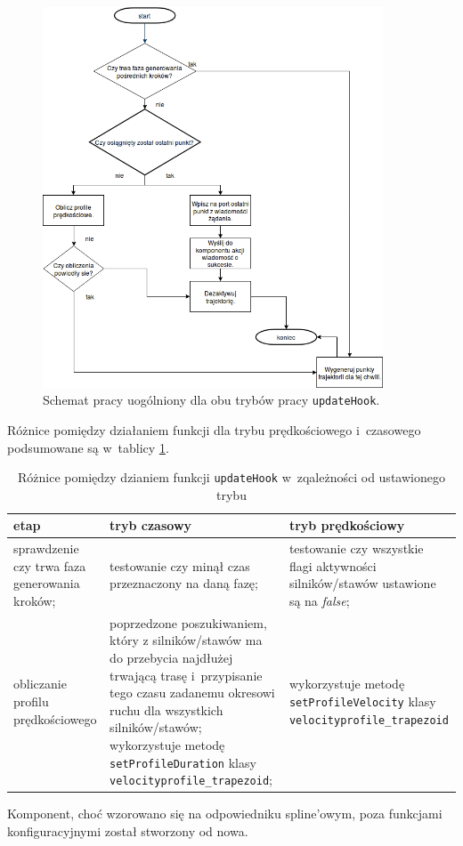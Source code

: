 \documentclass[a4paper, 12pt]{article}
\begin{document}
	\begin{figure}[H]
	\centering
	\includegraphics[width=0.9\textwidth]{raport_pics/updateHookDiagram.png}
	\caption{Schemat pracy uogólniony dla obu trybów pracy \texttt{updateHook}.}
	\label{fig:uHD}
	\end{figure}
	\par Różnice pomiędzy działaniem funkcji dla trybu prędkościowego i~czasowego podsumowane są w~tablicy \ref{tab:modediffUH}.
	
	\begin{table}[H]
	\label{tab:modediffUH}
	\centering
	\begin{tabular}{|m{9em}|m{14em}|m{14em}|}
	\hline
	etap & tryb czasowy & tryb prędkościowy\\
	\hline
	\hline
	sprawdzenie czy trwa faza generowania kroków; & testowanie czy minął czas przeznaczony na daną fazę; & testowanie czy wszystkie flagi aktywności silników/stawów ustawione są na \textit{false}; \\  
	\hline
	obliczanie profilu prędkościowego & poprzedzone poszukiwaniem, który z silników/stawów ma do przebycia najdłużej trwającą trasę i~przypisanie tego czasu zadanemu okresowi ruchu dla wszystkich silników/stawów; wykorzystuje metodę \texttt{setProfileDuration} klasy \texttt{velocityprofile\_trapezoid}; & wykorzystuje metodę \texttt{setProfileVelocity} klasy \texttt{velocityprofile\_trapezoid}\\
	\hline
	\end{tabular}
	\caption{Różnice pomiędzy dzianiem funkcji \texttt{updateHook} w~zqależności od ustawionego trybu}
	\end{table}
	\par Komponent, choć wzorowano się na odpowiedniku spline'owym, poza  funkcjami konfiguracyjnymi został stworzony od nowa.
\end{document}
